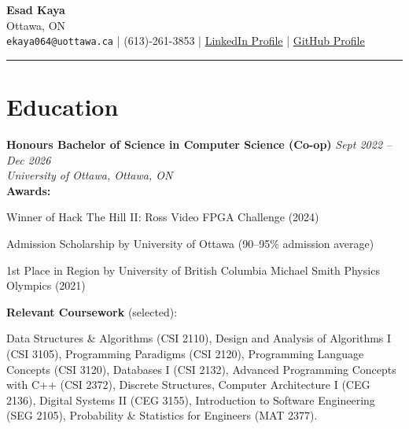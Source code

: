 \documentclass[11pt]{article}
\begin{document}
\begin{center}
    {\Huge \textbf{Esad Kaya}}\\
    \vspace{5pt}
    Ottawa, ON \\
    \texttt{ekaya064@uottawa.ca} \quad | \quad (613)-261-3853 \quad | \quad
    \href{https://www.linkedin.com/in/esad-kaya-28b400215/}{LinkedIn Profile} \quad | \quad
    \href{https://github.com/Integer-Conversion-Error}{GitHub Profile}
\end{center}


\hrule
\vspace{-0.4em}



\section*{Education}
\noindent\textbf{Honours Bachelor of Science in Computer Science (Co-op)} \hfill \textit{Sept 2022 -- Dec 2026} \\
\textit{University of Ottawa, Ottawa, ON} \\

\noindent\textbf{Awards:}
\begin{small}
\begin{compactitem}
    \item Winner of Hack The Hill II: Ross Video FPGA Challenge (2024)
    \item Admission Scholarship by University of Ottawa (90--95\% admission average)
    \item 1st Place in Region by University of British Columbia Michael Smith Physics Olympics (2021)

\end{compactitem}
\end{small}

\noindent\textbf{Relevant Coursework} (selected):  
\begin{small}Data Structures \& Algorithms (CSI 2110), Design and Analysis of Algorithms I (CSI 3105), Programming Paradigms (CSI 2120), Programming Language Concepts (CSI 3120), Databases I (CSI 2132), Advanced Programming Concepts with C++ (CSI 2372), Discrete Structures, Computer Architecture I (CEG 2136), Digital Systems II (CEG 3155), Introduction to Software Engineering (SEG 2105), Probability \& Statistics for Engineers (MAT 2377).
\end{small}
\end{document}
